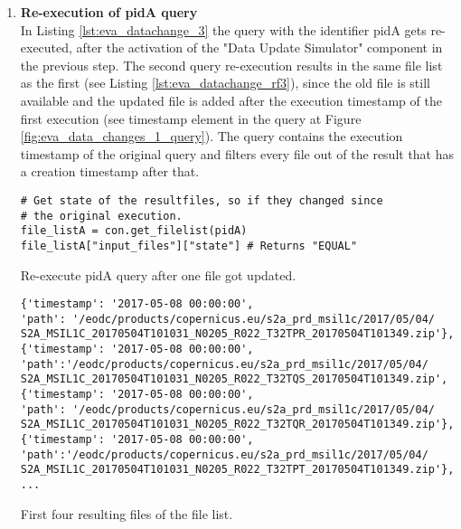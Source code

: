 \documentclass[draft,final]{vutinfth} %
\newenvironment{code}{\captionsetup{type=listing}}{}
\begin{document}
\begin{enumerate}
	\item \textbf{Re-execution of pidA query} \\
	In Listing \ref{lst:eva_datachange_3} the query with the identifier pidA gets re-executed, after the activation of the "Data Update Simulator" component in the previous step. The second query re-execution results in the same file list as the first (see Listing \ref{lst:eva_datachange_rf3}), since the old file is still available and the updated file is added after the execution timestamp of the first execution (see timestamp element in the query at Figure \ref{fig:eva_data_changes_1_query}). The query contains the execution timestamp of the original query and filters every file out of the result that has a creation timestamp after that.
	\begin{code}
		\begin{verbatim}
# Get state of the resultfiles, so if they changed since 
# the original execution. 
file_listA = con.get_filelist(pidA)
file_listA["input_files"]["state"] # Returns "EQUAL"
		\end{verbatim}
		\caption{Re-execute pidA query after one file got updated.}
		\label{lst:eva_datachange_3}
	\end{code}
	
	\begin{code}
		\begin{verbatim}
{'timestamp': '2017-05-08 00:00:00', 
'path': '/eodc/products/copernicus.eu/s2a_prd_msil1c/2017/05/04/
S2A_MSIL1C_20170504T101031_N0205_R022_T32TPR_20170504T101349.zip'}, 
{'timestamp': '2017-05-08 00:00:00',
'path':'/eodc/products/copernicus.eu/s2a_prd_msil1c/2017/05/04/
S2A_MSIL1C_20170504T101031_N0205_R022_T32TQS_20170504T101349.zip', 
{'timestamp': '2017-05-08 00:00:00', 
'path': '/eodc/products/copernicus.eu/s2a_prd_msil1c/2017/05/04/
S2A_MSIL1C_20170504T101031_N0205_R022_T32TQR_20170504T101349.zip'}, 
{'timestamp': '2017-05-08 00:00:00',
'path':'/eodc/products/copernicus.eu/s2a_prd_msil1c/2017/05/04/
S2A_MSIL1C_20170504T101031_N0205_R022_T32TPT_20170504T101349.zip'},
...
		\end{verbatim}
		\caption{First four resulting files of the file list.}
		\label{lst:eva_datachange_rf3}
	\end{code}
	

\end{enumerate}
\end{document}
